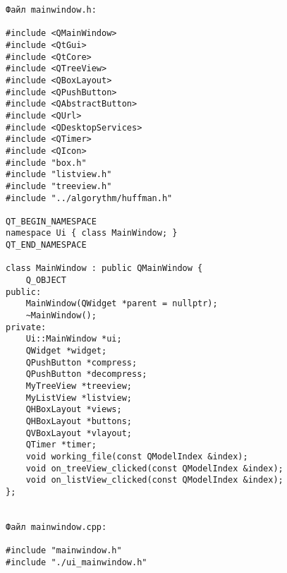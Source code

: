 \begin{verbatim}
Файл mainwindow.h:

#include <QMainWindow>
#include <QtGui>
#include <QtCore>
#include <QTreeView>
#include <QBoxLayout>
#include <QPushButton>
#include <QAbstractButton>
#include <QUrl>
#include <QDesktopServices>
#include <QTimer>
#include <QIcon>
#include "box.h"
#include "listview.h"
#include "treeview.h"
#include "../algorythm/huffman.h"

QT_BEGIN_NAMESPACE
namespace Ui { class MainWindow; }
QT_END_NAMESPACE

class MainWindow : public QMainWindow {
    Q_OBJECT
public:
    MainWindow(QWidget *parent = nullptr);
    ~MainWindow();
private:
    Ui::MainWindow *ui;
    QWidget *widget;
    QPushButton *compress;
    QPushButton *decompress;
    MyTreeView *treeview;
    MyListView *listview;
    QHBoxLayout *views;
    QHBoxLayout *buttons;
    QVBoxLayout *vlayout;
    QTimer *timer;
    void working_file(const QModelIndex &index);
    void on_treeView_clicked(const QModelIndex &index);
    void on_listView_clicked(const QModelIndex &index);
};


Файл mainwindow.cpp:

#include "mainwindow.h"
#include "./ui_mainwindow.h"


\end{verbatim}
